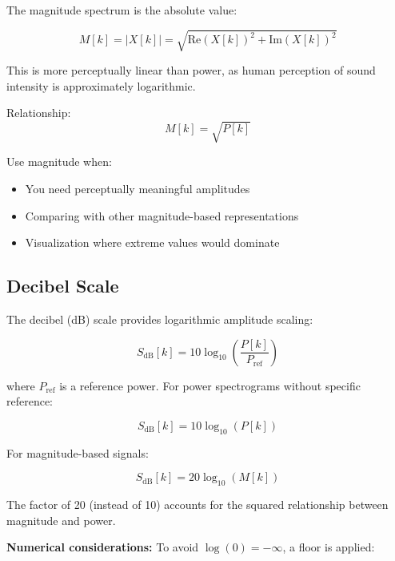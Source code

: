 The magnitude spectrum is the absolute value:

\begin{equation}
  M[k] = |X[k]| = \sqrt{\text{Re}(X[k])^2 + \text{Im}(X[k])^{2}}
\end{equation}

This is more perceptually linear than power, as human perception of
sound intensity is approximately logarithmic.

Relationship:
\begin{equation}
  M[k] = \sqrt{P[k]}
\end{equation}

Use magnitude when:
\begin{itemize}
  \item You need perceptually meaningful amplitudes
  \item Comparing with other magnitude-based representations
  \item Visualization where extreme values would dominate
\end{itemize}

\subsection{Decibel Scale}\label{subsec:decibel}

The decibel (dB) scale provides logarithmic amplitude scaling:

\begin{equation}
  \label{eq:db_scale_ref}
  S_{\text{dB}}[k] = 10 \log_{10}\left(\frac{P[k]}{P_{\text{ref}}}\right)
\end{equation}

where $P_{\text{ref}}$ is a reference power. For power spectrograms
without specific reference:

\begin{equation}
  \label{eq:db_scale}
  S_{\text{dB}}[k] = 10 \log_{10}(P[k])
\end{equation}

For magnitude-based signals:

\begin{equation}
  \label{eq:db_scale_magnitude}
  S_{\text{dB}}[k] = 20 \log_{10}(M[k])
\end{equation}

The factor of 20 (instead of 10) accounts for the squared
relationship between magnitude and power.

\textbf{Numerical considerations:} To avoid $\log(0) = -\infty$, a
floor is applied:

